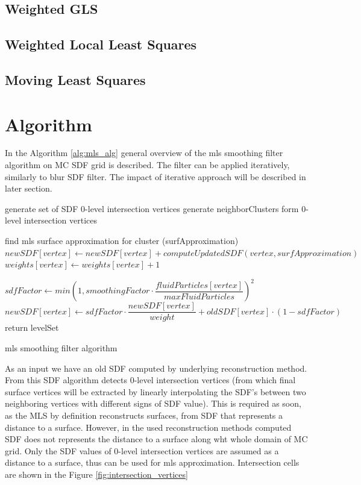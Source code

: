 \subsection{Weighted GLS}
\subsection{Weighted Local Least Squares}
\subsection{Moving Least Squares}

\section{Algorithm}
In the Algorithm \ref{alg:mls_alg} general overview of the mls smoothing filter algorithm on MC SDF grid is described. The filter can be applied iteratively, similarly to blur SDF filter. The impact of iterative approach will be described in later section.
\begin{algorithm}[H]
	\scriptsize
	\begin{algorithmic}
		\State generate set of SDF 0-level intersection vertices 
		\State generate neighborClusters form 0-level intersection vertices 
			
			\State find mls surface approximation for cluster (surfApproximation)
				\State $newSDF[vertex] \gets newSDF[vertex] + computeUpdatedSDF(vertex, surfApproximation)$
				\State $weights[vertex] \gets weights[vertex] + 1$
			\EndFor
		\EndFor

			\State $sdfFactor \gets min\left(1, smoothingFactor \cdot \dfrac{fluidParticles[vertex]}{maxFluidParticles}\right)^2$
			\State $newSDF[vertex] \gets sdfFactor \cdot \dfrac{newSDF[vertex]}{weight} + oldSDF[vertex] \cdot (1 - sdfFactor)$
		\EndFor
		\State return levelSet
	\end{algorithmic}
	\caption{mls smoothing filter algorithm}
	\label{alg:mls_alg}
\end{algorithm}
As an input we have an old SDF computed by underlying reconstruction method. From this SDF algorithm detects 0-level intersection vertices (from which final surface vertices will be extracted by linearly interpolating the SDF's between two neighboring vertices with different signs of SDF value). This is required as soon, as the MLS by definition reconstructs surfaces, from SDF that represents a distance to a surface. However, in the used reconstruction methods computed SDF does not represents the distance to a surface along wht whole domain of MC grid. Only the SDF values of 0-level intersection vertices are assumed as a distance to a surface, thus can be used for mls approximation. Intersection cells are shown in the Figure \ref{fig:intersection_vertices}\\

